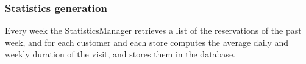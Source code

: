 \subsubsection{Statistics generation}
\begin{figure}[H]
	\noindent
\end{figure}
Every week the StatisticsManager retrieves a list of the reservations of the past week, and for each customer and each store computes the average daily and weekly duration of the visit, and stores them in the database.
